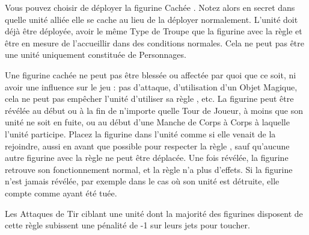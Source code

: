


Vous pouvez choisir de déployer la figurine \og Cachée \fg{}. Notez alors en secret dans quelle unité alliée elle se cache au lieu de la déployer normalement. L'unité doit déjà être déployée, avoir le même Type de Troupe que la figurine avec la règle \hidden{} et être en mesure de l'accueillir dans des conditions normales. Cela ne peut pas être une unité uniquement constituée de Personnages.

Une figurine cachée ne peut pas être blessée ou affectée par quoi que ce soit, ni avoir une influence sur le jeu : pas d'attaque, d'utilisation d'un Objet Magique, cela ne peut pas empêcher l'unité d'utiliser sa règle \vanguard{}, etc. La figurine peut être révélée au début ou à la fin de n'importe quelle Tour de Joueur, à moins que son unité ne soit en fuite, ou au début d'une Manche de Corps à Corps à laquelle l'unité participe. Placez la figurine dans l'unité comme si elle venait de la rejoindre, aussi en avant que possible pour respecter la règle \frontrank{}, sauf qu'aucune autre figurine avec la règle \frontrank{} ne peut être déplacée. Une fois révélée, la figurine retrouve son fonctionnement normal, et la règle n'a plus d'effets. Si la figurine n'est jamais révélée, par exemple dans le cas où son unité est détruite, elle compte comme ayant été tuée.


Les Attaques de Tir ciblant une unité dont la majorité des figurines disposent de cette règle subissent une pénalité de -1 sur leurs jets pour toucher.



